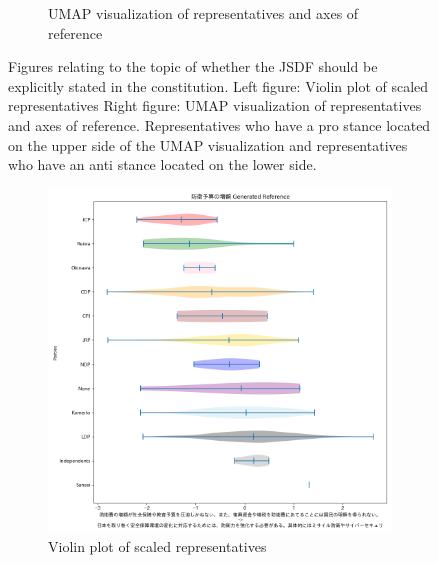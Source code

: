 \documentclass[final,5p,times,twocolumn,authoryear]{elsarticle}
\begin{document}
\begin{figure}[h]
\begin{subfigure}{0.22\textwidth}
      \caption{UMAP visualization of representatives and axes of reference}
    \end{subfigure}
\caption{Figures relating to the topic of whether the JSDF should be explicitly stated in the constitution.
Left figure: Violin plot of scaled representatives
Right figure: UMAP visualization of representatives and axes of reference. Representatives who have a pro stance located on the upper side of the UMAP visualization and representatives who have an anti stance located on the lower side.}
\label{fig: results-defence-constitution}
\end{figure}
\begin{figure}[h]
\centering
    \begin{subfigure}{0.22\textwidth}
      \centering
      \includegraphics[width=1\linewidth]{figs/results/defence/防衛予算の増額_gen_violin_plot.png}
      \caption{Violin plot of scaled representatives}
    \end{subfigure}
    \begin{subfigure}{0.22\textwidth}
      \centering

\end{subfigure}
\end{figure}
\end{document}
